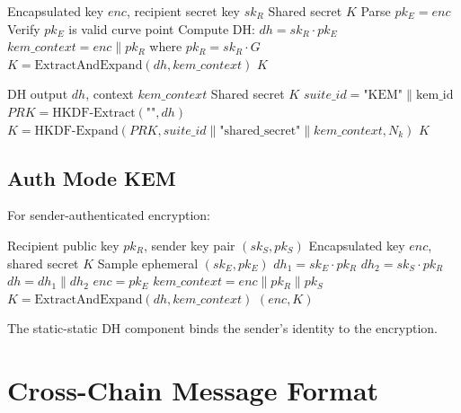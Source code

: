 \documentclass[11pt,a4paper]{article}
\begin{document}
\begin{algorithm}
\caption{DHKEM-Decap (Recipient)}
\begin{algorithmic}[1]
\Require Encapsulated key $enc$, recipient secret key $sk_R$
\Ensure Shared secret $K$
\State Parse $pk_E = enc$
\State Verify $pk_E$ is valid curve point
\State Compute DH: $dh = sk_R \cdot pk_E$
\State $kem\_context = enc \| pk_R$ where $pk_R = sk_R \cdot G$
\State $K = \text{ExtractAndExpand}(dh, kem\_context)$
\State \Return $K$
\end{algorithmic}
\end{algorithm}

\begin{algorithm}
\caption{ExtractAndExpand}
\begin{algorithmic}[1]
\Require DH output $dh$, context $kem\_context$
\Ensure Shared secret $K$
\State $suite\_id = \text{"KEM"} \| \text{kem\_id}$
\State $PRK = \text{HKDF-Extract}(\text{""}, dh)$
\State $K = \text{HKDF-Expand}(PRK, suite\_id \| \text{"shared\_secret"} \| kem\_context, N_k)$
\State \Return $K$
\end{algorithmic}
\end{algorithm}

\subsection{Auth Mode KEM}

For sender-authenticated encryption:

\begin{algorithm}
\caption{DHKEM-AuthEncap}
\begin{algorithmic}[1]
\Require Recipient public key $pk_R$, sender key pair $(sk_S, pk_S)$
\Ensure Encapsulated key $enc$, shared secret $K$
\State Sample ephemeral $(sk_E, pk_E)$
\State $dh_1 = sk_E \cdot pk_R$ 
\State $dh_2 = sk_S \cdot pk_R$ 
\State $dh = dh_1 \| dh_2$
\State $enc = pk_E$
\State $kem\_context = enc \| pk_R \| pk_S$
\State $K = \text{ExtractAndExpand}(dh, kem\_context)$
\State \Return $(enc, K)$
\end{algorithmic}
\end{algorithm}

The static-static DH component binds the sender's identity to the encryption.

\section{Cross-Chain Message Format}
\end{document}
